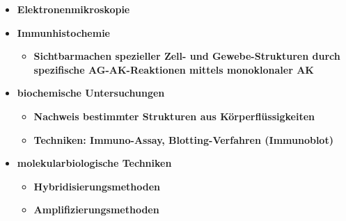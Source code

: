 \begin{itemize}
\begin{itemize}
				\item \textbf{Elektronenmikroskopie}
				\item \textbf{Immunhistochemie}
					\begin{itemize}
						\item \textbf{Sichtbarmachen spezieller Zell- und Gewebe-Strukturen durch spezifische AG-AK-Reaktionen mittels monoklonaler AK}
					\end{itemize}
				\item \textbf{biochemische Untersuchungen}
					\begin{itemize}
						\item \textbf{Nachweis bestimmter Strukturen aus Körperflüssigkeiten}
						\item \textbf{Techniken: Immuno-Assay, Blotting-Verfahren (Immunoblot)}
					\end{itemize}
				\item \textbf{molekularbiologische Techniken}
					\begin{itemize}
						\item \textbf{Hybridisierungsmethoden}
						\item \textbf{Amplifizierungsmethoden}
					\end{itemize}
		\end{itemize}
	\end{itemize}

\pagebreak
